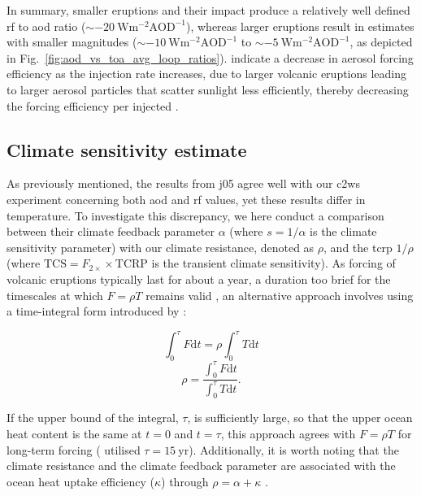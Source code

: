 \documentclass{ametsocV6.1}
\newcommand{\iso}[1][i]{{#1}njected \ce{SO2}}
\begin{document}
In summary, smaller eruptions and their impact produce a relatively well defined
\gls{rf} to \gls{aod} ratio (\(\sim \SI{-20}{\watt\metre^{-2}\mathrm{AOD}^{-1}}\)),
whereas larger eruptions result in estimates with smaller magnitudes (\(\sim
\SI{-10}{\watt\metre^{-2}\mathrm{AOD}^{-1}}\) to \(\sim
\SI{-5}{\watt\metre^{-2}\mathrm{AOD}^{-1}}\), as depicted in
Fig.~\ref{fig:aod_vs_toa_avg_loop_ratios}). \citet{niemeier2017} indicate a decrease in
aerosol forcing efficiency as the injection rate increases, due to larger volcanic
eruptions leading to larger aerosol particles that scatter sunlight less efficiently,
thereby decreasing the forcing efficiency per \iso{} \citep{english2013, timmreck2018}.

\subsection{Climate sensitivity estimate}

As previously mentioned, the results from \gls{j05} agree well with our \gls{c2ws}
experiment concerning both \gls{aod} and \gls{rf} values, yet these results differ in
temperature. To investigate this discrepancy, we here conduct a comparison between their
climate feedback parameter \(\alpha \) (where \(s=1/\alpha \) is the climate sensitivity
parameter) with our climate resistance, denoted as \(\rho \), and the \gls{tcrp}
\(1/\rho\) (where \(\mathrm{TCS}=F_{2\times}\times \mathrm{TCRP}\) is the transient
climate sensitivity). As forcing of volcanic eruptions typically last for about a year,
a duration too brief for the timescales at which \(F=\rho T\) remains valid
\citep{gregory2016}, an alternative approach involves using a time-integral form
introduced by \citet{merlis2014}:

\begin{equation}
  \int_0^{\tau}F \mathrm{d}t=\rho\int_{0}^{\tau}T \mathrm{d}t
\end{equation}
\begin{equation}
  \rho=\frac{\int_0^{\tau}F \mathrm{d}t}{\int_{0}^{\tau}T \mathrm{d}t}.
  \label{eq:climate-resistance}
\end{equation}

If the upper bound of the integral, \(\tau \), is sufficiently large, so that the upper
ocean heat content is the same at \(t=0\) and \(t=\tau \), this approach agrees with
\(F=\rho T\) for long-term forcing \citep{gregory2016} (\citet{merlis2014} utilised
\(\tau =\SI{15}{\mathrm{yr}}\)). Additionally, it is worth noting that the climate
resistance and the climate feedback parameter are associated with the ocean heat uptake
efficiency (\(\kappa \)) through \(\rho =\alpha +\kappa \) \citep{gregory2016}.
\end{document}
